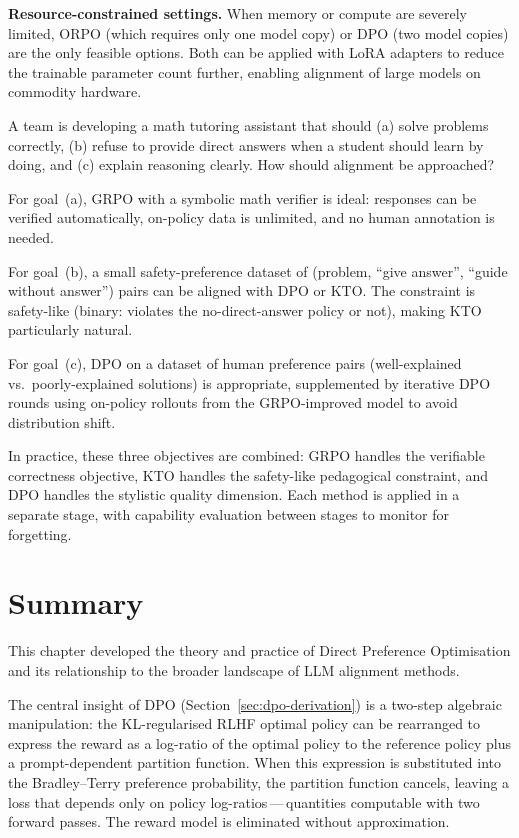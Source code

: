 \textbf{Resource-constrained settings.} When memory or compute are severely limited, ORPO (which requires only one model copy) or DPO (two model copies) are the only feasible options. Both can be applied with LoRA adapters to reduce the trainable parameter count further, enabling alignment of large models on commodity hardware.

\begin{example}
\label{ex:alignment-choice}
A team is developing a math tutoring assistant that should (a) solve problems correctly, (b) refuse to provide direct answers when a student should learn by doing, and (c) explain reasoning clearly. How should alignment be approached?

For goal~(a), GRPO with a symbolic math verifier is ideal: responses can be verified automatically, on-policy data is unlimited, and no human annotation is needed.

For goal~(b), a small safety-preference dataset of (problem, ``give answer'', ``guide without answer'') pairs can be aligned with DPO or KTO. The constraint is safety-like (binary: violates the no-direct-answer policy or not), making KTO particularly natural.

For goal~(c), DPO on a dataset of human preference pairs (well-explained vs.\ poorly-explained solutions) is appropriate, supplemented by iterative DPO rounds using on-policy rollouts from the GRPO-improved model to avoid distribution shift.

In practice, these three objectives are combined: GRPO handles the verifiable correctness objective, KTO handles the safety-like pedagogical constraint, and DPO handles the stylistic quality dimension. Each method is applied in a separate stage, with capability evaluation between stages to monitor for forgetting.
\end{example}

\section{Summary}
\label{sec:ch12-summary}

This chapter developed the theory and practice of Direct Preference Optimisation and its relationship to the broader landscape of LLM alignment methods.

The central insight of DPO (Section~\ref{sec:dpo-derivation}) is a two-step algebraic manipulation: the KL-regularised RLHF optimal policy can be rearranged to express the reward as a log-ratio of the optimal policy to the reference policy plus a prompt-dependent partition function. When this expression is substituted into the Bradley--Terry preference probability, the partition function cancels, leaving a loss that depends only on policy log-ratios\,---\,quantities computable with two forward passes. The reward model is eliminated without approximation.

